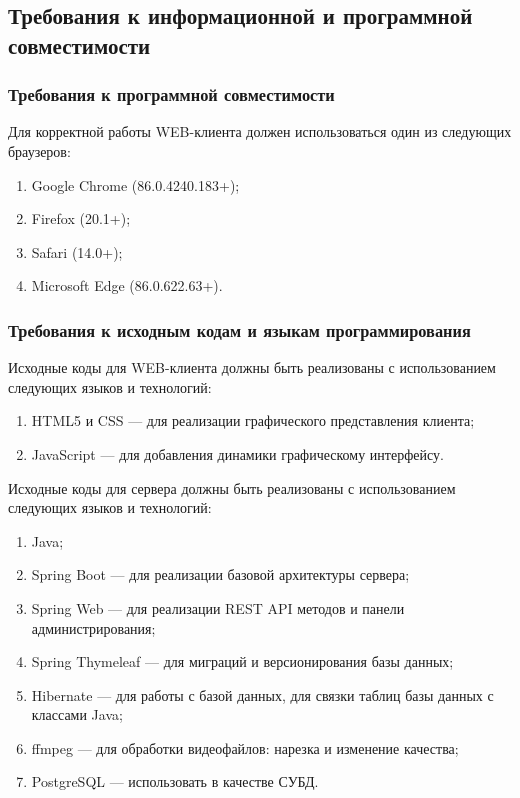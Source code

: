 \subsection{Требования к информационной и программной совместимости}

\subsubsection{Требования к программной совместимости}
Для корректной работы WEB-клиента должен использоваться один из следующих браузеров:
\begin{enumerate}[noitemsep]
    \item Google Chrome (86.0.4240.183+);
    \item Firefox (20.1+);
    \item Safari (14.0+);
    \item Microsoft Edge (86.0.622.63+).
\end{enumerate}

\subsubsection{Требования к исходным кодам и языкам программирования}

Исходные коды для WEB-клиента должны быть реализованы с использованием следующих языков и технологий:
\begin{enumerate}[noitemsep]
    \item HTML5 и CSS — для реализации графического представления клиента;
    \item JavaScript — для добавления динамики графическому интерфейсу.
\end{enumerate}

Исходные коды для сервера должны быть реализованы с использованием следующих языков и технологий:
\begin{enumerate}[noitemsep]
    \item Java;
    \item Spring Boot — для реализации базовой архитектуры сервера;
    \item Spring Web — для реализации REST API методов и панели администрирования;
    \item Spring Thymeleaf — для миграций и версионирования базы данных;
    \item Hibernate — для работы с базой данных, для связки таблиц базы данных с классами Java;
    \item ffmpeg — для обработки видеофайлов: нарезка и изменение качества;
    \item PostgreSQL — использовать в качестве СУБД.
\end{enumerate}

